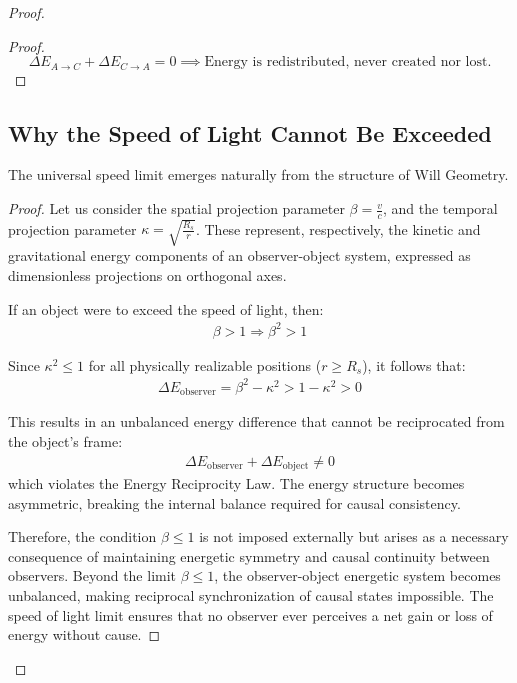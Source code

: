 \documentclass{article}
\begin{document}
\begin{theorem}
\begin{proof}
\begin{proof}
\[
\boxed{

\Delta E_{A\rightarrow C} + \Delta E_{C\rightarrow A} = 0 \implies \text{Energy is redistributed, never created nor lost.}}

\]
\end{proof}

\subsection{Why the Speed of Light Cannot Be Exceeded}

\begin{theorem}
The universal speed limit emerges naturally from the structure of Will Geometry.
\end{theorem}

\begin{proof}
Let us consider the spatial projection parameter $\beta = \frac{v}{c}$, and the temporal projection parameter $\kappa = \sqrt{\frac{R_s}{r}}$. These represent, respectively, the kinetic and gravitational energy components of an observer-object system, expressed as dimensionless projections on orthogonal axes.

If an object were to exceed the speed of light, then:
\begin{align}
\beta > 1 \Rightarrow \beta^2 > 1
\end{align}

Since $\kappa^2 \leq 1$ for all physically realizable positions ($r \geq R_s$), it follows that:
\begin{align}
\Delta E_{\text{observer}} = \beta^2 - \kappa^2 > 1 - \kappa^2 > 0
\end{align}

This results in an unbalanced energy difference that cannot be reciprocated from the object's frame:
\begin{align}
\Delta E_{\text{observer}} + \Delta E_{\text{object}} \neq 0
\end{align}
which violates the Energy Reciprocity Law. The energy structure becomes asymmetric, breaking the internal balance required for causal consistency.

Therefore, the condition $\beta \leq 1$ is not imposed externally but arises as a necessary consequence of maintaining energetic symmetry and causal continuity between observers. Beyond the limit $\beta \leq 1$, the observer-object energetic system becomes unbalanced, making reciprocal synchronization of causal states impossible. The speed of light limit ensures that no observer ever perceives a net gain or loss of energy without cause.


\end{proof}
\end{proof}
\end{theorem}
\end{document}
